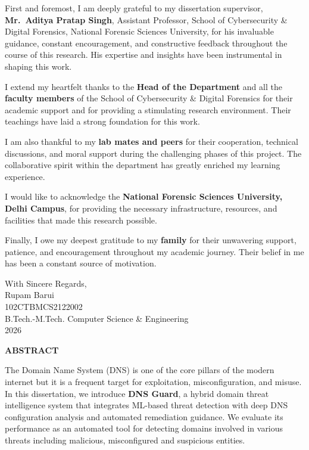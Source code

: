 \documentclass[12pt, a4paper, oneside]{report}
\newcommand{\univName}{National Forensic Sciences University}
\newcommand{\univCampus}{Delhi Campus}
\newcommand{\supervisorName}{Mr.\ Aditya Pratap Singh}
\newcommand{\supervisorTitle}{Assistant Professor}
\newcommand{\studentName}{Rupam Barui}
\newcommand{\enrollNo}{102CTBMCS2122002}
\newcommand{\courseName}{B.Tech.-M.Tech. Computer Science \& Engineering}
\newcommand{\passYear}{2026}
\begin{document}
First and foremost, I am deeply grateful to my dissertation supervisor, \textbf{\supervisorName}, \supervisorTitle, School of Cybersecurity \& Digital Forensics, National Forensic Sciences University, for his invaluable guidance, constant encouragement, and constructive feedback throughout the course of this research. His expertise and insights have been instrumental in shaping this work.

I extend my heartfelt thanks to the \textbf{Head of the Department} and all the \textbf{faculty members} of the School of Cybersecurity \& Digital Forensics for their academic support and for providing a stimulating research environment. Their teachings have laid a strong foundation for this work.

I am also thankful to my \textbf{lab mates and peers} for their cooperation, technical discussions, and moral support during the challenging phases of this project. The collaborative spirit within the department has greatly enriched my learning experience.

I would like to acknowledge the \textbf{\univName, \univCampus}, for providing the necessary infrastructure, resources, and facilities that made this research possible.

Finally, I owe my deepest gratitude to my \textbf{family} for their unwavering support, patience, and encouragement throughout my academic journey. Their belief in me has been a constant source of motivation.

\vspace{1.5cm}

\noindent
\hfill
\begin{minipage}[t]{0.45\textwidth}
  \raggedleft
  With Sincere Regards,\\[1.5cm]
  \studentName\\
  \enrollNo\\
  \courseName\\
  \passYear
\end{minipage}

\newpage

\pagestyle{plain}

\begin{center}
  {\large\bfseries \textcolor{nfsuRed}{ABSTRACT}}
\end{center}

\vspace{0.5cm}

The Domain Name System (DNS) is one of the core pillars of the modern internet but it is a frequent target for exploitation, misconfiguration, and misuse. In this dissertation, we introduce \textbf{DNS Guard}, a hybrid domain threat intelligence system that integrates ML-based threat detection with deep DNS configuration analysis and automated remediation guidance. We evaluate its performance as an automated tool for detecting domains involved in various threats including malicious, misconfigured and suspicious entities.
\end{document}

